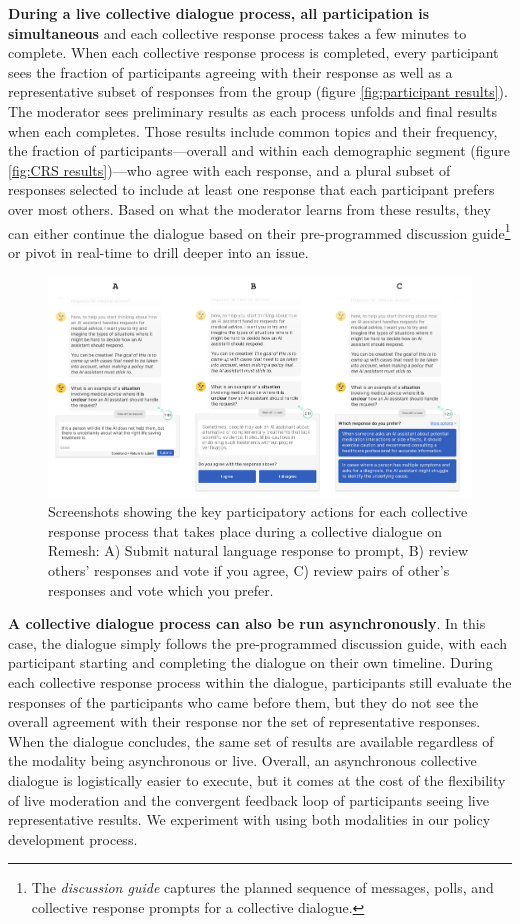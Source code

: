 \documentclass{article}
\begin{document}
\textbf{During a live collective dialogue process, all participation is simultaneous} and each collective response process takes a few minutes to complete. When each collective response process is completed, every participant sees the fraction of participants agreeing with their response as well as a representative subset of responses from the group (figure \ref{fig:participant results}). The moderator sees preliminary results as each process unfolds and final results when each completes. Those results include common topics and their frequency, the fraction of participants---overall and within each demographic segment (figure \ref{fig:CRS results})---who agree with each response, and a plural subset of responses selected to include at least one response that each participant prefers over most others. Based on what the moderator learns from these results, they can either continue the dialogue based on their pre-programmed discussion guide\footnote{The \emph{discussion guide} captures the planned sequence of messages, polls, and collective response prompts for a collective dialogue.} or pivot in real-time to drill deeper into an issue.

\begin{figure}[H]
\centering
  \includegraphics[width=1.0\linewidth]{figs/CRS_participation.png}
  \caption{Screenshots showing the key participatory actions for each collective response process that takes place during a collective dialogue on Remesh: A) Submit natural language response to prompt, B) review others' responses and vote if you agree, C) review pairs of other's responses and vote which you prefer.}
  \label{fig:CRS participation}
\end{figure}

\textbf{A collective dialogue process can also be run asynchronously}. In this case, the dialogue simply follows the pre-programmed discussion guide, with each participant starting and completing the dialogue on their own timeline. During each collective response process within the dialogue, participants still evaluate the responses of the participants who came before them, but they do not see the overall agreement with their response nor the set of representative responses. When the dialogue concludes, the same set of results are available regardless of the modality being asynchronous or live. Overall, an asynchronous collective dialogue is logistically easier to execute, but it comes at the cost of the flexibility of live moderation and the convergent feedback loop of participants seeing live representative results. We experiment with using both modalities in our policy development process. 
\end{document}
